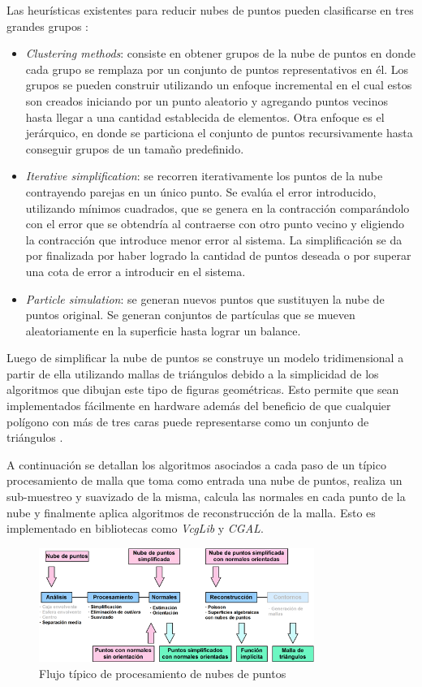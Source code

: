 Las heurísticas existentes para reducir nubes de puntos pueden clasificarse en tres grandes grupos \cite{PntCloud}:
\begin{itemize}
   \item \emph{Clustering methods}: consiste en obtener grupos de la nube de puntos en donde cada grupo se remplaza por un conjunto de puntos representativos en él. Los grupos se pueden construir utilizando un enfoque incremental en el cual estos son creados iniciando por un punto aleatorio y agregando puntos vecinos hasta llegar a una cantidad establecida de elementos. Otra enfoque es el jerárquico, en donde se particiona el conjunto de puntos recursivamente hasta conseguir grupos de un tamaño predefinido.
   \item \emph{Iterative simplification}: se recorren iterativamente los puntos de la nube contrayendo parejas en un único punto. Se evalúa el error introducido, utilizando mínimos cuadrados, que se genera en la contracción comparándolo con el error que se obtendría al contraerse con otro punto vecino y eligiendo la contracción que introduce menor error al sistema. La simplificación se da por finalizada por haber logrado la cantidad de puntos deseada o por superar una cota de error a introducir en el sistema.
   \item \emph{Particle simulation}: se generan nuevos puntos que sustituyen la nube de puntos original. Se generan conjuntos de partículas que se mueven aleatoriamente en la superficie hasta lograr un balance.
\end{itemize}

Luego de simplificar la nube de puntos se construye un modelo tridimensional a partir de ella utilizando mallas de triángulos debido a la simplicidad de los algoritmos que dibujan este tipo de figuras geométricas. Esto permite que sean implementados fácilmente en hardware además del beneficio de que cualquier polígono con más de tres caras puede representarse como un conjunto de triángulos \cite{PCloudTriangle}.

A continuación se detallan los algoritmos asociados a cada paso de un típico procesamiento de malla que toma como entrada una nube de puntos, realiza un sub-muestreo y suavizado de la misma, calcula las normales en cada punto de la nube y finalmente aplica algoritmos de reconstrucción de la malla. Esto es implementado en bibliotecas como \emph{VcgLib}\cite{VCGLib} y \emph{CGAL}\cite{CGAL}.

\begin{figure}[H]
  \centering
    \includegraphics[width=0.8\textwidth]{./Cap2_videomapping/malla-flow-2.png}
  \caption[http://www.cgal.org]{Flujo típico de procesamiento de nubes de puntos \cite{CGAL}}
  \label{fig:Mesh-CGAL}
\end{figure}

